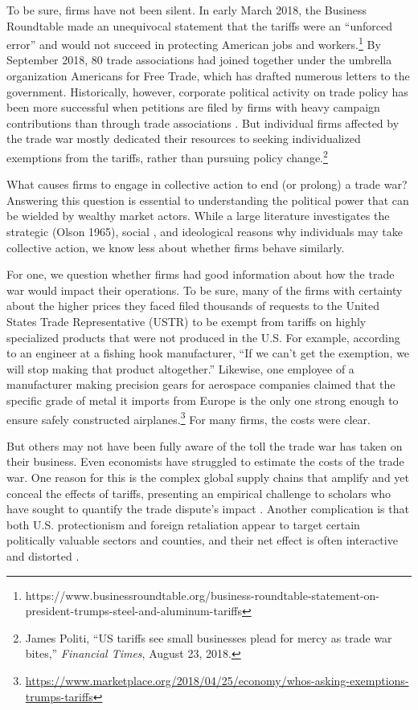 \documentclass{article}
\begin{document}
To be sure, firms have not been silent. In early March 2018, the Business Roundtable made an unequivocal statement that the tariffs were an ``unforced error'' and would not succeed in protecting American jobs and workers.\footnote{https://www.businessroundtable.org/business-roundtable-statement-on-president-trumps-steel-and-aluminum-tariffs} By September 2018, 80 trade associations had joined together under the umbrella organization Americans for Free Trade, which has drafted numerous letters to the government. Historically, however, corporate political activity on trade policy has been more successful when petitions are filed by firms with heavy campaign contributions than through trade associations \citep{rehbein1994determining}. But individual firms affected by the trade war mostly dedicated their resources to seeking individualized exemptions from the tariffs, rather than pursuing policy change.\footnote{James Politi, ``US tariffs see small businesses plead for mercy as trade war bites,'' \textit{Financial Times}, August 23, 2018.}

What causes firms to engage in collective action to end (or prolong) a trade war? Answering this question is essential to understanding the political power that can be wielded by wealthy market actors. While a large literature investigates the strategic (Olson 1965), social \citep{gerber2008social}, and ideological reasons why individuals may take collective action, we know less about whether firms behave similarly.

For one, we question whether firms had good information about how the trade war would impact their operations. To be sure, many of the firms with certainty about the higher prices they faced filed thousands of requests to the United States Trade Representative (USTR) to be exempt from tariffs on highly specialized products that were not produced in the U.S. For example, according to an engineer at a fishing hook manufacturer, ``If we can't get the exemption, we will stop making that product altogether.'' Likewise, one employee of a manufacturer making precision gears for aerospace companies claimed that the specific grade of metal it imports from Europe is the only one strong enough to ensure safely constructed airplanes.\footnote{\url{https://www.marketplace.org/2018/04/25/economy/whos-asking-exemptions-trumps-tariffs}} For many firms, the costs were clear.

But others may not have been fully aware of the toll the trade war has taken on their business. Even economists have struggled to estimate the costs of the trade war. One reason for this is the complex global supply chains that amplify and yet conceal the effects of tariffs, presenting an empirical challenge to scholars who have sought to quantify the trade dispute's impact \citep{flaaen2019disentangling}. Another complication is that both U.S. protectionism and foreign retaliation appear to target certain politically valuable sectors and counties, and their net effect is often interactive and distorted \citep{fajgelbaum2020return}.
\end{document}
